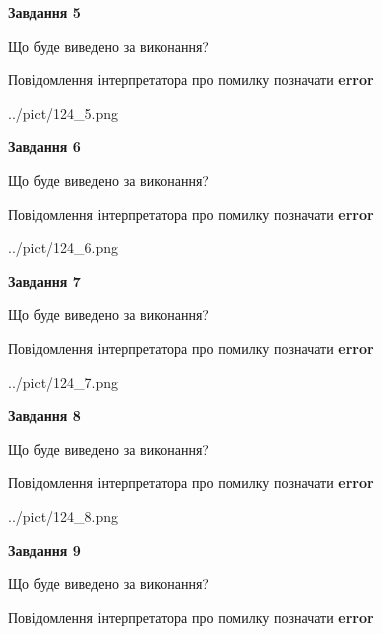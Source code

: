\documentclass[11pt, ukrainian]{article}
\begin{document}
{\begin {large}
{\begin {center}\textbf{Завдання 5}\end {center}}\par
Що буде виведено за виконання? \par
Повідомлення інтерпретатора про помилку позначати \textbf{error}

\begin{center}
	{../pict/124_5.png}
\end{center}
\newpage

{\begin {center}\textbf{Завдання 6}\end {center}}\par
Що буде виведено за виконання? \par
Повідомлення інтерпретатора про помилку позначати \textbf{error}

\begin{center}
	{../pict/124_6.png}
\end{center}
\newpage

{\begin {center}\textbf{Завдання 7}\end {center}}\par
Що буде виведено за виконання? \par
Повідомлення інтерпретатора про помилку позначати \textbf{error}

\begin{center}
	{../pict/124_7.png}
\end{center}
\newpage

{\begin {center}\textbf{Завдання 8}\end {center}}\par
Що буде виведено за виконання? \par
Повідомлення інтерпретатора про помилку позначати \textbf{error}

\begin{center}
	{../pict/124_8.png}
\end{center}
\newpage

{\begin {center}\textbf{Завдання 9}\end {center}}\par
Що буде виведено за виконання? \par
Повідомлення інтерпретатора про помилку позначати \textbf{error}


\end{large}}
\end{document}
